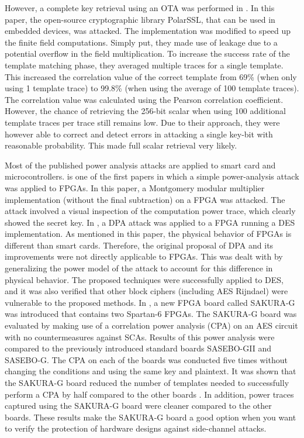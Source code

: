 However, a complete key retrieval using an OTA was performed in \cite{dugardin2016dismantling}.
In this paper, the open-source cryptographic library PolarSSL, that can be used in embedded devices, was attacked.
The implementation was modified to speed up the finite field computations.
Simply put, they made use of leakage due to a potential overflow in the field multiplication.
To increase the success rate of the template matching phase, they averaged multiple traces for a single template.
This increased the correlation value of the correct template from 69\% (when only using 1 template trace) to 99.8\% (when using the average of 100 template traces). 
The correlation value was calculated using the Pearson correlation coefficient.
However, the chance of retrieving the 256-bit scalar when using 100 additional template traces per trace still remains low.
Due to their approach, they were however able to correct and detect errors in attacking a single key-bit with reasonable probability.
This made full scalar retrieval very likely.

Most of the published power analysis attacks are applied to smart card and microcontrollers.
\cite{ors2003power} is one of the first papers in which a simple power-analysis attack was applied to FPGAs.
In this paper, a Montgomery modular multiplier implementation (without the final subtraction) on a FPGA was attacked.
The attack involved a visual inspection of the computation power trace, which clearly showed the secret key.
In \cite{standaert2004power}, a DPA attack was applied to a FPGA running a DES implementation. 
As mentioned in this paper, the physical behavior of FPGAs is different than smart cards.
Therefore, the original proposal of DPA and its improvements were not directly applicable to FPGAs.
This was dealt with by generalizing the power model of the attack to account for this difference in physical behavior.
The proposed techniques were successfully applied to DES, and it was also verified that other block ciphers (including AES Rijndael) were vulnerable to the proposed methods.
In \cite{guntur2014side}, a new FPGA board called SAKURA-G was introduced that contains two Spartan-6 FPGAs.
The SAKURA-G board was evaluated by making use of a correlation power analysis (CPA) on an AES circuit with no countermeasures against SCAs.
Results of this power analysis were compared to the previously introduced standard boards SASEBO-GII and SASEBO-G.
The CPA on each of the boards was conducted five times without changing the conditions and using the same key and plaintext.
It was shown that the SAKURA-G board reduced the number of templates needed to successfully perform a CPA by half compared to the other boards \cite{guntur2014side}. 
In addition, power traces captured using the SAKURA-G board were cleaner compared to the other boards. 
These results make the SAKURA-G board a good option when you want to verify the protection of hardware designs against side-channel attacks.

